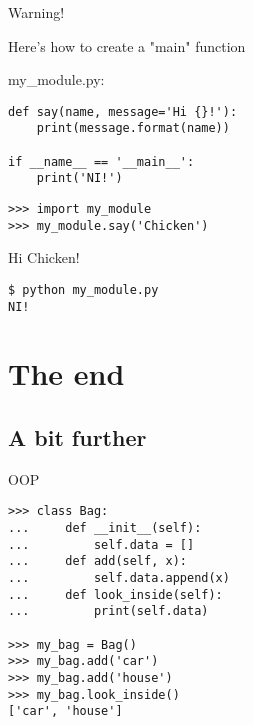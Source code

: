 \documentclass[ignorenonframetext,]{beamer}
\begin{document}
\begin{frame}[fragile]{Warning!}

    Here's how to create a "main" function

    my\_module.py:
    \begin{tcolorbox}
        \begin{verbatim}
def say(name, message='Hi {}!'):
    print(message.format(name))

if __name__ == '__main__':
    print('NI!')
        \end{verbatim}
    \end{tcolorbox}

    \begin{tcolorbox}
        \begin{verbatim}
>>> import my_module
>>> my_module.say('Chicken')
        \end{verbatim}
Hi Chicken!
    \end{tcolorbox}

    \begin{tcolorbox}
        \begin{Verbatim}[fontsize=\small]
$ python my_module.py
NI!
        \end{Verbatim}
    \end{tcolorbox}
\end{frame}

\section{The end}
\subsection{A bit further}

\begin{frame}[fragile]{OOP}
    \begin{tcolorbox}
        \begin{verbatim}
>>> class Bag:
...     def __init__(self):
...         self.data = []
...     def add(self, x):
...         self.data.append(x)
...     def look_inside(self):
...         print(self.data)

>>> my_bag = Bag()
>>> my_bag.add('car')
>>> my_bag.add('house')
>>> my_bag.look_inside()
['car', 'house']
        \end{verbatim}
    \end{tcolorbox}
\end{frame}
\end{document}
